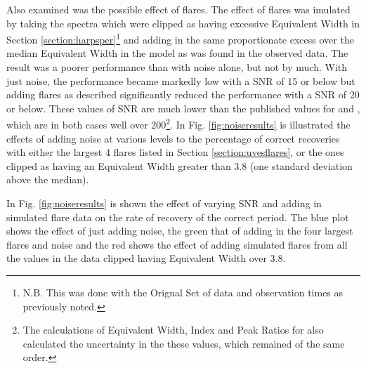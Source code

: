 Also examined was the possible effect of flares. The effect of flares was imulated by taking the spectra
which were clipped as having excessive Equivalent Width in Section \ref{section:harpsper}\footnote{N.B. This was done
  with the Orignal Set of data and observation times as previously noted.} and adding in the same
proportionate excess over the median Equivalent Width in the model as was found in the observed data. The result was a
poorer performance than with noise alone, but not by much. With just noise, the performance became markedly low with a
SNR of 15 or below but adding flares as described significantly reduced the performance with a SNR of 20 or below. These
values of SNR are much lower than the published values for {\uves} and {\harps}, which are in both cases well over
200\footnote{The calculations of Equivalent Width, {\ha} Index and Peak Ratios for {\harps} also calculated the
  uncertainty in the these values, which remained of the same order.}. In Fig. \ref{fig:noiseresults} is illustrated the
effects of adding noise at various levels to the percentage of correct recoveries with either the largest 4 flares
listed in Section \ref{section:uvesflares}, or the ones clipped as having an Equivalent Width greater than 3.8 (one
standard deviation above the median).

In Fig. \ref{fig:noiseresults} is shown the effect of varying SNR and adding in simulated flare data on the rate of
recovery of the correct period. The blue plot shows the effect of just adding noise, the green that of adding in the
four largest flares and noise and the red shows the effect of adding simulated flares from all the values in the
{\harps} data clipped having Equivalent Width over 3.8.

